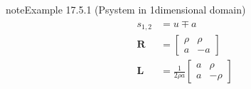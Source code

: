 \documentclass[letterpaper,10pt,english]{jupyterBook}
\begin{document}
\begin{sphinxadmonition}{note}{Example 17.5.1 (P\sphinxhyphen{}system in 1\sphinxhyphen{}dimensional domain)}
\begin{equation*}
\end{equation*}\begin{equation*}
\begin{split}\begin{aligned}
  s_{1,2} & = u \mp a \\
  \mathbf{R} & = \begin{bmatrix} \rho & \rho \\ a & -a  \end{bmatrix} \\
  \mathbf{L} & = \frac{1}{2 \rho a} \begin{bmatrix} a & \rho \\ a & -\rho  \end{bmatrix} \\
\end{aligned}\end{split}
\end{equation*}\end{sphinxadmonition}
\label{ch/pde/hyperbolic:example-5}
\end{document}
